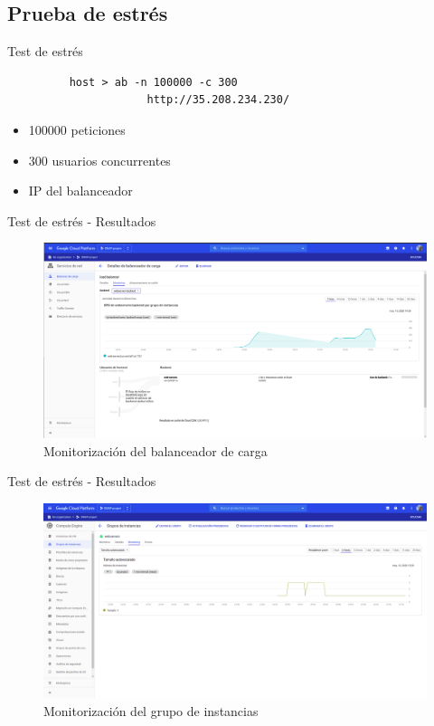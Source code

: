 \documentclass{beamer}
\begin{document}
\subsection{Prueba de estrés}

\begin{frame}[fragile]{Test de estrés}
  \begin{figure}[H]
		\begin{lstlisting}
	host > ab -n 100000 -c 300
                http://35.208.234.230/
		\end{lstlisting}
\end{figure}
\begin{itemize}[<+->]
  \item 100000 peticiones
  \item 300 usuarios concurrentes
  \item IP del balanceador
\end{itemize}
\end{frame}

\begin{frame}[fragile]{Test de estrés - Resultados}
  \begin{figure}[H]
	    \centering
			\includegraphics[width=\textwidth]{project/monitoring.png}
			\caption{Monitorización del balanceador de carga}
	\end{figure}
\end{frame}
\begin{frame}[fragile]{Test de estrés - Resultados}
  \begin{figure}[H]
	    \centering
			\includegraphics[width=\textwidth]{project/monitoring_groups.png}
			\caption{Monitorización del grupo de instancias}
	\end{figure}
\end{frame}
\end{document}
